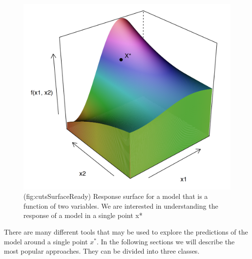 \documentclass[]{krantz}
\theoremstyle{definition}
\theoremstyle{definition}
\theoremstyle{definition}
\theoremstyle{remark}
\begin{document}
\begin{figure}

{\centering \includegraphics[width=0.6\linewidth]{figure/cuts_surface_ready_punkt} 

}

\caption{(fig:cutsSurfaceReady) Response surface for a model that is a function of two variables. We are interested in understanding the response of a model in a single point x*}\label{fig:cutsSurfaceReady}
\end{figure}

There are many different tools that may be used to explore the
predictions of the model around a single point \(x^*\). In the following
sections we will describe the most popular approaches. They can be
divided into three classes.
\end{document}
